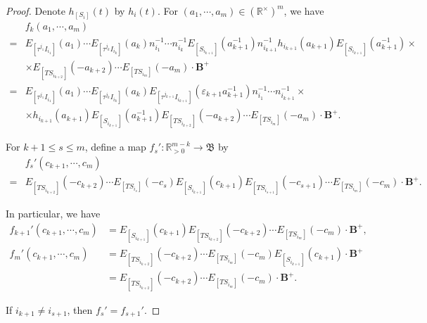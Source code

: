 \documentclass[12pt]{amsart}
\begin{document}
\begin{proof}
    Denote $h_{[S_i]}(t)$ by $h_i(t)$.
For $(a_1,\cdots,a_m)\in (\mathbb{R}^{\times})^m$, we have 
\begin{align*}
    &f_k(a_1,\cdots,a_m)\\
    =&E_{[\tau^{j_1}I_{i_1}]}(a_1) \cdots E_{[\tau^{j_k}I_{i_k}]}(a_k) n_{i_1}^{-1}\cdots n_{i_k}^{-1} E_{[S_{i_{k+1}}]}(a_{k+1}^{-1}) n_{i_{k+1}}^{-1} h_{i_{k+1}}(a_{k+1}) E_{[S_{i_{k+1}}]}(a_{k+1}^{-1})\times \\
    & \times  E_{[TS_{i_{k+2}}]}(-a_{k+2}) \cdots E_{[TS_{i_m}]}(-a_m) \cdot \mathbf{B}^+\\
    =&E_{[\tau^{j_1}I_{i_1}]}(a_1) \cdots E_{[\tau^{j_k}I_{i_k}]}(a_k) E_{[\tau^{j_{k+1}}I_{i_{k+1}}]}(\varepsilon_{k+1}a_{k+1}^{-1}) n_{i_1}^{-1}\cdots n_{i_{k+1}}^{-1}\times \\ 
    & \times h_{i_{k+1}}(a_{k+1}) E_{[S_{i_{k+1}}]}(a_{k+1}^{-1}) E_{[TS_{i_{k+2}}]}(-a_{k+2}) \cdots E_{[TS_{i_m}]}(-a_m) \cdot \mathbf{B}^+.
\end{align*}

    For $k+1\leq s \leq m$, define a map $f_s':\mathbb{R}_{>0}^{m-k}\rightarrow \mathfrak{B}$ by 
    \begin{align*}
        &f_s'(c_{k+1},\cdots,c_m)\\
        =&E_{[TS_{i_{k+2}}]}(-c_{k+2})\cdots E_{[TS_{i_{s}}]}(-c_s) E_{[S_{i_{k+1}}]}(c_{k+1}) E_{[TS_{i_{s+1}}]}(-c_{s+1})\cdots E_{[TS_{i_m}]}(-c_m)\cdot \mathbf{B}^+.
    \end{align*}

    In particular, we have 
    \begin{align*}
        f_{k+1}'(c_{k+1},\cdots,c_m)&=E_{[S_{i_{k+1}}]}(c_{k+1}) E_{[TS_{i_{k+2}}]}(-c_{k+2})\cdots E_{[TS_{i_{m}}]}(-c_m)\cdot \mathbf{B}^+,\\
        f_m'(c_{k+1},\cdots,c_m)&=E_{[TS_{i_{k+2}}]}(-c_{k+2})\cdots E_{[TS_{i_{m}}]}(-c_m)E_{[S_{i_{k+1}}]}(c_{k+1}) \cdot \mathbf{B}^+\\
        &= E_{[TS_{i_{k+2}}]}(-c_{k+2})\cdots E_{[TS_{i_{m}}]}(-c_m) \cdot \mathbf{B}^+.
    \end{align*}

    If $i_{k+1}\neq i_{s+1}$, then $f_s'=f_{s+1}'$.


\end{proof}
\end{document}
